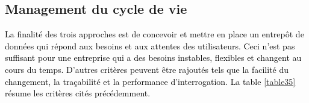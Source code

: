 \documentclass[a4paper,12pt]{report}
\begin{document}
\begin{table}[H]
	\caption{Comparaison entre les approches selon l'intégration de données et ETL}
	\label{table34}
\end{table}	

\subsection{Management du cycle de vie}
\textcolor{black}{La finalité des trois approches est de concevoir et mettre en place un entrepôt de données qui répond aux besoins et aux attentes des utilisateurs. Ceci n’est pas suffisant pour une entreprise qui a des besoins instables, flexibles et changent au cours du temps. D'autres critères peuvent être rajoutés tels que la facilité du changement, la traçabilité et la performance d’interrogation. La table \ref{table35} résume les critères cités précédemment.}
\end{document}

